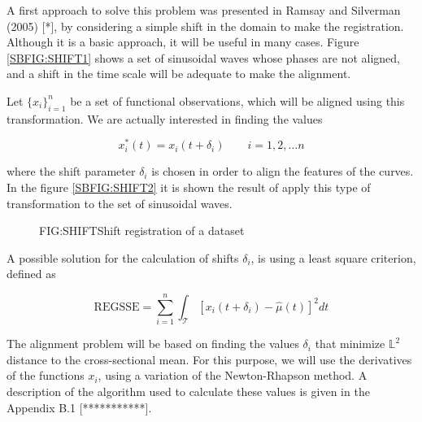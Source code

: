 A first approach to solve this problem was presented in Ramsay and Silverman
(2005) [*], by considering a simple shift in the domain to make the
registration. Although it is a basic approach, it will be useful in many cases.
Figure \ref{SBFIG:SHIFT1} shows a set of sinusoidal waves whose phases are not
aligned, and a shift in the time scale will be adequate to make the alignment.

Let $\{x_i\}_{i=1}^n$ be a set of functional observations, which will be aligned
using this transformation. We are actually interested in finding the values

$$
x_i^*(t)=x_i(t+ \delta_i) \qquad i=1,2, \dots n
$$

where the shift parameter $\delta_i$ is chosen in order to align the features of
the curves. In the figure \ref{SBFIG:SHIFT2} it is shown the result of apply
this type of transformation to the set of sinusoidal waves.

\begin{figure}[Shift registration of a dataset]{FIG:SHIFT}{Shift registration of a dataset}
   \quad
\end{figure}

A possible solution for the calculation of shifts $\delta_i$, is using a least
square criterion, defined as

$$
\text{REGSSE} = \sum_{i=1}^{n}\int_{\mathcal{T}}\left [x_i(t+\delta_i) - \hat \mu(t) \right ]^2 dt
$$

The alignment problem will be based on finding the values $\delta_i$ that
minimize $\mathbb{L}^2$ distance to the cross-sectional mean. For this purpose, we will use the derivatives of the functions $x_i$, using a variation of the
Newton-Rhapson method. A description of the algorithm used to calculate these values is given in the Appendix B.1 [***********].
